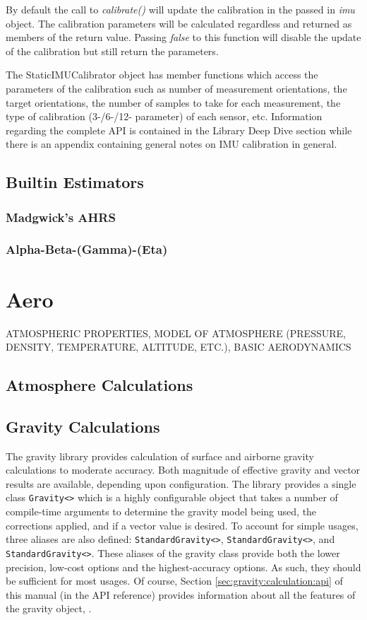 \documentclass[10pt,letterpaper]{memoir} %
\begin{document}
By default the call to \emph{calibrate()} will update the calibration in the passed in \emph{imu} object.  The calibration parameters will be calculated regardless and returned as members of the return value.  Passing \emph{false} to this function will disable the update of the calibration but still return the parameters.

The StaticIMUCalibrator object has member functions which access the parameters of the calibration such as number of measurement orientations, the target orientations, the number of samples to take for each measurement, the type of calibration (3-/6-/12- parameter) of each sensor, etc.  Information regarding the complete API is contained in the Library Deep Dive section while there is an appendix containing general notes on IMU calibration in general.

\subsection{Builtin Estimators}
\subsubsection{Madgwick's AHRS}
\subsubsection{Alpha-Beta-(Gamma)-(Eta)}

\section{Aero}
ATMOSPHERIC PROPERTIES, MODEL OF ATMOSPHERE (PRESSURE, DENSITY, TEMPERATURE, ALTITUDE, ETC.), BASIC AERODYNAMICS
\subsection{Atmosphere Calculations}
\subsection{Gravity Calculations}
The gravity library provides calculation of surface and airborne gravity calculations to moderate accuracy.  Both magnitude of effective gravity and vector results are available, depending upon configuration.  The library provides a single class \texttt{Gravity<>} which is a highly configurable object that takes a number of compile-time arguments to determine the gravity model being used, the corrections applied, and if a vector value is desired.  To account for simple usages, three aliases are also defined: \texttt{StandardGravity<>}, \texttt{StandardGravity<>}, and \texttt{StandardGravity<>}.  These aliases of the gravity class provide both the lower precision, low-cost options and the highest-accuracy options.  As such, they should be sufficient for most usages.  Of course, Section \ref{sec:gravity:calculation:api} of this manual (in the API reference) provides information about all the features of the gravity object, . 
\end{document}
